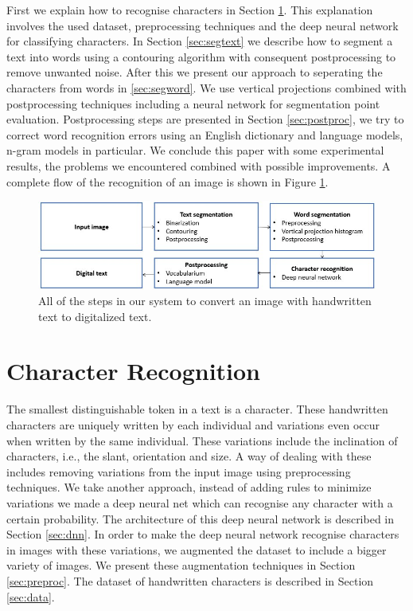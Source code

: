 \documentclass{article}
\begin{document}
First we explain how to recognise characters in Section \ref{sec:charrec}. This explanation involves the used dataset, preprocessing techniques and the deep neural network for classifying characters. 
In Section \ref{sec:segtext} we describe how to segment a text into words using a contouring algorithm with consequent postprocessing to remove unwanted noise. 
After this we present our approach to seperating the characters from words in \ref{sec:segword}. We use vertical projections combined with postprocessing techniques including a neural network for segmentation point evaluation.
Postprocessing steps are presented in Section \ref{sec:postproc}, we try to correct word recognition errors using an English dictionary and language models, n-gram models in particular.
We conclude this paper with some experimental results, the problems we encountered combined with possible improvements. A complete flow of the recognition of an image is shown in Figure \ref{fig:flow}.

\begin{figure}
  \centering
  \includegraphics[width=\linewidth]{images/flow_hor}
  \caption{All of the steps in our system to convert an image with handwritten text to digitalized text.}
  \label{fig:flow}
\end{figure}

\section{Character Recognition}
\label{sec:charrec}
The smallest distinguishable token in a text is a character. These handwritten characters are uniquely 
written by each individual and variations even occur when written by the same individual. These variations include the inclination of characters, i.e., the slant, orientation and size. 
A way of dealing with these includes removing variations from the input image using preprocessing techniques. 
We take another approach, instead of adding rules to minimize variations we made a deep neural net which can recognise any character with a certain probability. The architecture of this deep neural network is described in Section \ref{sec:dnn}. 
In order to make the deep neural network recognise characters in images with these variations, we augmented the dataset to include a bigger variety of images. We present these augmentation techniques in Section \ref{sec:preproc}. 
The dataset of handwritten characters is described in Section \ref{sec:data}.
\end{document}
